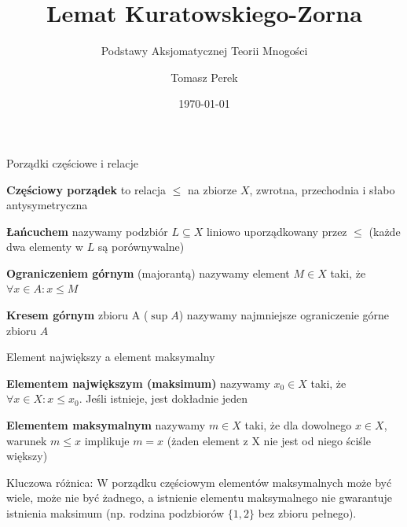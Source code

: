 \documentclass[aspectratio=169,11pt,t,envcountsect,professionalfonts]{beamer}
\title[Lemat Kuratowskiego-Zorna]{Lemat Kuratowskiego-Zorna}
\subtitle{Podstawy Aksjomatycznej Teorii Mnogości}
\author{Tomasz Perek}
\institute{Matematyka zaoczna III rok\\ UKSW}
\date{\today}
\begin{document}
\begin{frame}
  \titlepage
\end{frame}


\begin{frame}[allowframebreaks]{Porządki częściowe i relacje}
  \begin{mydef}
  \textbf{Częściowy porządek} to relacja $\leqslant$ na zbiorze $X$,  zwrotna, przechodnia i słabo antysymetryczna
  \end{mydef}
  \begin{mydef}[Łańcuch]
  \textbf{Łańcuchem} nazywamy podzbiór $L \subseteq X$ liniowo uporządkowany przez $\leqslant$ (każde dwa elementy w $L$ są porównywalne)
  \end{mydef}

  \begin{mydef}
  \textbf{Ograniczeniem górnym} (majorantą) nazywamy element $M \in X$ taki, że $\forall x \in A: x \leqslant M$
  \end{mydef}

  \begin{mydef}
  \textbf{Kresem górnym} zbioru A ($\sup A$) nazywamy najmniejsze ograniczenie górne zbioru $A$
  \end{mydef}
    
\end{frame}

\begin{frame}{Element największy a element maksymalny}
\begin{mydef}[Maksimum]
    \textbf{Elementem największym (maksimum)} nazywamy $x_0 \in X$ taki, że $\forall x \in X: x \leqslant x_0$. Jeśli istnieje, jest dokładnie jeden
\end{mydef}
\begin{mydef}
    \textbf{Elementem maksymalnym} nazywamy $m \in X$ taki, że dla dowolnego $x \in X$, warunek $m \leqslant x$ implikuje $m = x$ (żaden element z X nie jest od niego ściśle większy)
\end{mydef}

Kluczowa różnica: W porządku częściowym elementów maksymalnych może być wiele, może nie być żadnego, a istnienie elementu maksymalnego nie gwarantuje istnienia maksimum (np. rodzina podzbiorów $\{1, 2\}$ bez zbioru pełnego).
    
\end{frame}
\end{document}
